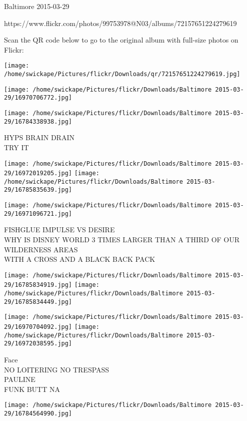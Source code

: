 \documentclass[10pt,letterpaper]{article}
\begin{document}
Baltimore 2015-03-29

https://www.flickr.com/photos/99753978@N03/albums/72157651224279619

Scan the QR code below to go to the original album with full-size photos on Flickr:

\texttt{[image: /home/swickape/Pictures/flickr/Downloads/qr/72157651224279619.jpg]}
\pagebreak

\texttt{[image: /home/swickape/Pictures/flickr/Downloads/Baltimore 2015-03-29/16970706772.jpg]}

\vspace{0.25in}
\texttt{[image: /home/swickape/Pictures/flickr/Downloads/Baltimore 2015-03-29/16784338938.jpg]}

HYPS BRAIN DRAIN\\
TRY IT\\
\pagebreak

\texttt{[image: /home/swickape/Pictures/flickr/Downloads/Baltimore 2015-03-29/16972019205.jpg]}
\texttt{[image: /home/swickape/Pictures/flickr/Downloads/Baltimore 2015-03-29/16785835639.jpg]}

\vspace{0.25in}
\texttt{[image: /home/swickape/Pictures/flickr/Downloads/Baltimore 2015-03-29/16971096721.jpg]}

FISHGLUE IMPULSE VS DESIRE\\
WHY IS DISNEY WORLD 3 TIMES LARGER THAN A THIRD OF OUR WILDERNESS AREAS\\
WITH A CROSS AND A BLACK BACK PACK\\
\pagebreak

\texttt{[image: /home/swickape/Pictures/flickr/Downloads/Baltimore 2015-03-29/16785834919.jpg]}
\texttt{[image: /home/swickape/Pictures/flickr/Downloads/Baltimore 2015-03-29/16785834449.jpg]}

\texttt{[image: /home/swickape/Pictures/flickr/Downloads/Baltimore 2015-03-29/16970704092.jpg]}
\texttt{[image: /home/swickape/Pictures/flickr/Downloads/Baltimore 2015-03-29/16972038595.jpg]}

Face\\
NO LOITERING NO TRESPASS\\
PAULINE\\
FUNK BUTT NA\\
\pagebreak

\texttt{[image: /home/swickape/Pictures/flickr/Downloads/Baltimore 2015-03-29/16784564990.jpg]}
\end{document}

